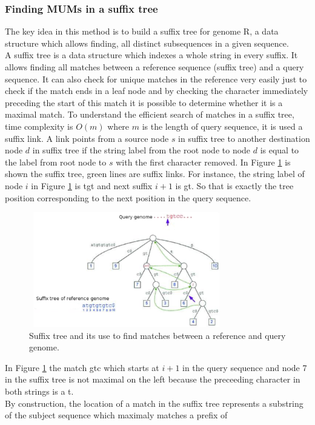 \documentclass[3p,times]{elsarticle}
\begin{document}
\subsubsection{Finding MUMs in a suffix tree} 
The key idea in this method is to build a suffix tree for genome R, a data structure which allows finding, all distinct subsequences in a given sequence.\\
A suffix tree is a data structure which indexes a whole string in every suffix. It allows finding all matches between a reference sequence (suffix tree) and a query sequence. It can also check for unique matches in the reference very easily just to check if the match ends in a leaf node and by checking the character immediately preceding the start of this match it is possible to determine whether it is a maximal match. To understand the efficient search of matches in a suffix tree, time complexity is $O(m)$ where $m$ is the length of query sequence, it is used a suffix link. A link points from a source node $s$ in suffix tree to another destination node $d$ in suffix tree if the string label from the root node to node $d$ is equal to the label from root node to $s$ with the first character removed. In Figure \ref{fig:st} is shown the suffix tree, green lines are suffix links. For instance, the string label of node $i$ in Figure \ref{fig:st} is tgt and next suffix $i+1$ is gt. So that is exactly the tree position corresponding to the next position in the query sequence.\\
\begin{figure}
  \centering
  \includegraphics[width=8.5cm,height=5cm]{st-mum.pdf}
\caption{Suffix tree and its use to find matches between a reference and query genome.}
\label{fig:st}
\end{figure}
In Figure \ref{fig:st} the match gtc which starts at $i+1$ in the query sequence and node 7 in the suffix tree is not maximal on the left because the preceeding character in both strings is a t.\\
  By construction, the location of a match in the suffix tree represents a substring of the subject sequence which maximaly matches a prefix of
\end{document}
